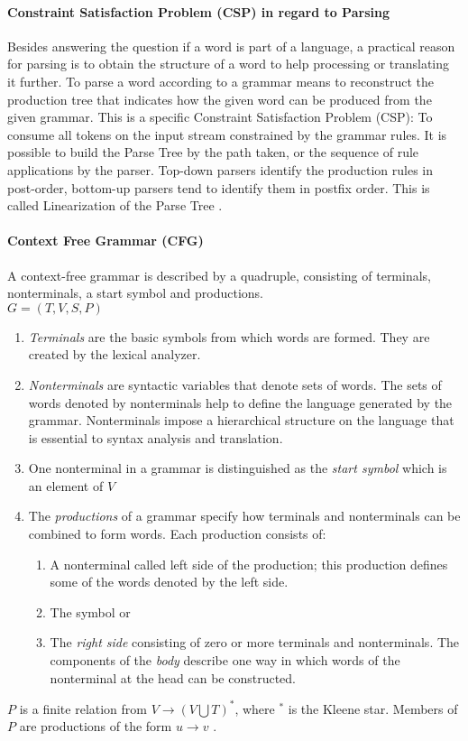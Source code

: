 \paragraph{Constraint Satisfaction Problem (CSP) in regard to Parsing} 
Besides answering the question if a word is part of a language, a practical reason for parsing is to obtain the structure of a word to help processing or translating it further. To parse a word according to a grammar means to reconstruct the production tree that indicates how the given word can be produced from the given grammar. This is a specific Constraint Satisfaction Problem (CSP): To consume all tokens on the input stream constrained by the grammar rules. It is possible to build the Parse Tree by the path taken, or the sequence of rule applications by the parser.  Top-down parsers identify the production rules in post-order, bottom-up parsers tend to identify them in postfix order. This is called Linearization of the Parse Tree \cite{ParserBook}.

\paragraph{Context Free Grammar (CFG)}
A context-free grammar is described by a quadruple, consisting of terminals, nonterminals, a start symbol and productions.\\
$G = (T, V, S, P)$
\begin{enumerate}
	\item \emph{Terminals} are the basic symbols from which words are formed.  They are created by the lexical analyzer.
	\item \emph{Nonterminals} are syntactic variables that denote sets of words. The sets of words denoted by nonterminals help to define the language generated by the grammar. Nonterminals impose a hierarchical structure on the language that is essential to syntax analysis and translation.
	\item One nonterminal in a grammar is distinguished as the \emph{start symbol} which is an element of $V$
	\item The \emph{productions} of a grammar specify how terminals and nonterminals can be combined to form words. Each production consists of:
	\begin{enumerate}
		\item A nonterminal called left side of the production; this production defines some of the words denoted by the left side.
		\item The symbol \code{$\rightarrow$}  or  \code{::=} 
		\item The \emph{right side} consisting of zero or more terminals and nonterminals. The components of the \emph{body} describe one way in which words of the nonterminal at the head can be constructed.
	\end{enumerate}
\end{enumerate}
 $P$ is a finite relation from $V \rightarrow (V  \bigcup  T)^*$, where $^*$ is the Kleene star. Members of $P$ are productions of the form $u \rightarrow v$ \cite{DragonBook}.

